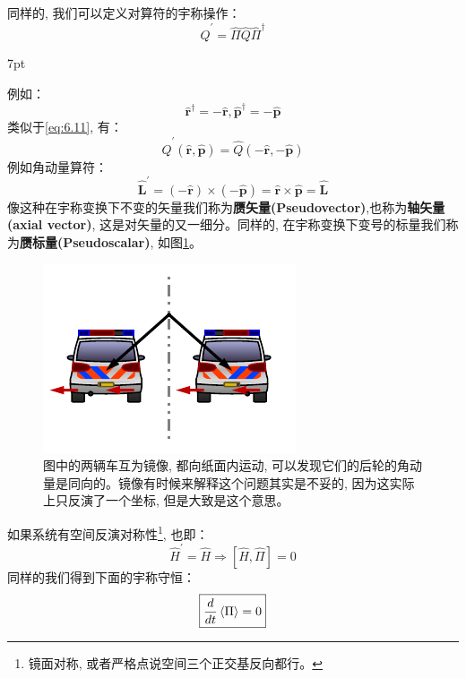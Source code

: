 \documentclass[a4paper,zihao=-4,linespread=1]{ctexrep}
\newenvironment{thinknote}{%
\def\FrameCommand{%
\hspace{1pt}%
{\color{BurlyWood}\vrule width 2pt}%
{\color{formalshade}\vrule width 4pt}%
\colorbox{formalshade}%
}%
\MakeFramed{\advance\hsize-\width\FrameRestore}%
\noindent\hspace{-4.55pt}%
\begin{adjustwidth}{}{7pt}%
\vspace{2pt}\vspace{2pt}%
}
{%
\vspace{2pt}\end{adjustwidth}\endMakeFramed%
}
\begin{document}
    同样的, 我们可以定义对算符的宇称操作：
    \begin{equation}
        \hat{Q}^\prime=\hat{\Pi}\hat{Q}\hat{\Pi}^\dagger
    \end{equation}
    \begin{thinknote}
        例如：
        \[\hat{\mathbf{r}}^\dagger=-\hat{\mathbf{r}},\hat{\mathbf{p}}^\dagger=-\hat{\mathbf{p}}\]
        类似于\ref{eq:6.11}, 有：
        \begin{equation}
            \hat{Q}^\prime(\hat{\mathbf{r}},\hat{\mathbf{p}})=\hat{Q}(-\hat{\mathbf{r}},-\hat{\mathbf{p}})
        \end{equation}
        例如角动量算符：
        \begin{equation}
            \hat{\mathbf{L}}^\prime=(-\hat{\mathbf{r}})\times(-\hat{\mathbf{p}})=\hat{\mathbf{r}}\times\hat{\mathbf{p}}=\hat{\mathbf{L}}
        \end{equation}
        像这种在宇称变换下不变的矢量我们称为\textbf{赝矢量(Pseudovector)},也称为\textbf{轴矢量(axial vector)}, 这是对矢量的又一细分。同样的, 在宇称变换下变号的标量我们称为\textbf{赝标量(Pseudoscalar)}, 如图\ref{fig:6.3}。
    \end{thinknote}
    \begin{figure}[htbp]
        \centering
        \includegraphics[scale=2]{fig/6.3.pdf}
        \caption{图中的两辆车互为镜像, 都向纸面内运动, 可以发现它们的后轮的角动量是同向的。镜像有时候来解释这个问题其实是不妥的, 因为这实际上只反演了一个坐标, 但是大致是这个意思。}
        \label{fig:6.3}
    \end{figure}

    如果系统有空间反演对称性\footnote{镜面对称, 或者严格点说空间三个正交基反向都行。}, 也即：
    \begin{equation}
        \label{eq:6.26}
        \hat{H}^\prime=\hat{H}\Rightarrow\boxed{\left[\hat{H},\hat{\Pi}\right]=0}
    \end{equation}
    同样的我们得到下面的宇称守恒：
    \begin{equation}
        \boxed{\frac{d}{dt}\braket{\Pi}=0}
    \end{equation}
    
\end{document}
